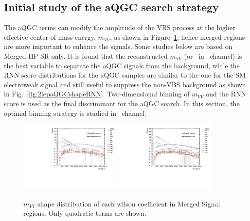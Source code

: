 
\subsection{Initial study of the aQGC search strategy}

The aQGC terms can modify the amplitude of the VBS process at the higher effective center-of-mass energy, 
$m_{VV}$, as shown in Figure~\ref{fig:2lepaQGCshapeMVV}, hence merged regions are more important to enhance the signals.
Some studies below are based on Merged HP SR only.
It is found that the reconstructed $m_{VV}$ (or \mt\ in \zlep\ channel) is the best variable to separate the aQGC signals from the background,
while the RNN score distributions for the aQGC samples are similar to the one for the SM electroweak signal and still useful to suppress the non-VBS background as shown in Fig.~\ref{fig:2lepaQGCshapeRNN}.
Two-dimensional binning of $m_{VV}$ and the RNN score is used as the final discriminant for the aQGC search.
In this section, the optimal binning strategy is studied in \tlep\ channel.

\begin{figure}[]
    \centering
   \includegraphics[width=0.45\textwidth]{figures/aQGC/MllJ_SR_HP_aQGC.pdf}
   \includegraphics[width=0.45\textwidth]{figures/aQGC/MllJ_SR_LP_aQGC.pdf}
    \caption{$m_{VV}$ shape distribution of each wilson coefficient in Merged Signal regions. Only quadratic terms are shown.}
    \label{fig:2lepaQGCshapeMVV}
\end{figure}

